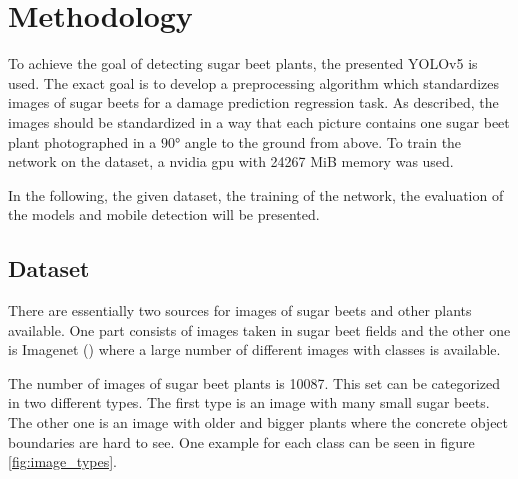 
\chapter{Methodology}

To achieve the goal of detecting sugar beet plants, the presented YOLOv5 is used. The exact goal is to develop a preprocessing algorithm which standardizes images of sugar beets for a damage prediction regression task. As described, the images should be standardized in a way that each picture contains one sugar beet plant photographed in a $ 90° $ angle to the ground from above. To train the network on the dataset, a nvidia gpu with 24267 MiB memory was used.

In the following, the given dataset, the training of the network, the evaluation of the models and mobile detection  will be presented.

\section{Dataset}

There are essentially two sources for images of sugar beets and other plants available. One part consists of images taken in sugar beet fields and the other one is Imagenet (\cite{deng2009imagenet}) where a large number of different images with classes is available.

The number of images of sugar beet plants is 10087. This set can be categorized in two different types. The first type is an image with many small sugar beets. The other one is an image with older and bigger plants where the concrete object boundaries are hard to see. One example for each class can be seen in figure \ref{fig:image_types}.

